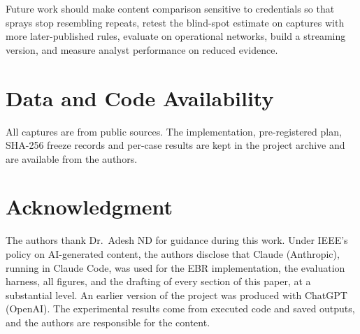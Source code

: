 \documentclass[conference]{IEEEtran}
\begin{document}
Future work should make content comparison sensitive to credentials so that sprays stop resembling repeats, retest the blind-spot estimate on captures with more later-published rules, evaluate on operational networks, build a streaming version, and measure analyst performance on reduced evidence.

\section*{Data and Code Availability}
All captures are from public sources. The implementation, pre-registered plan, SHA-256 freeze records and per-case results are kept in the project archive and are available from the authors.

\section*{Acknowledgment}
The authors thank Dr.\ Adesh ND for guidance during this work. Under IEEE's policy on AI-generated content, the authors disclose that Claude (Anthropic), running in Claude Code, was used for the EBR implementation, the evaluation harness, all figures, and the drafting of every section of this paper, at a substantial level. An earlier version of the project was produced with ChatGPT (OpenAI). The experimental results come from executed code and saved outputs, and the authors are responsible for the content.
\end{document}

